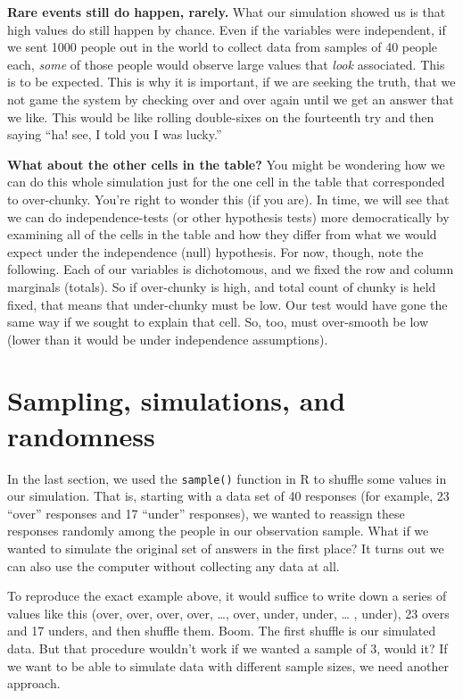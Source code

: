 \documentclass[openany]{book}
\begin{document}
\textbf{Rare events still do happen, rarely.} What our simulation showed us is that high values do still happen by chance. Even if the variables were independent, if we sent 1000 people out in the world to collect data from samples of 40 people each, \emph{some} of those people would observe large values that \emph{look} associated. This is to be expected. This is why it is important, if we are seeking the truth, that we not game the system by checking over and over again until we get an answer that we like. This would be like rolling double-sixes on the fourteenth try and then saying ``ha! see, I told you I was lucky.''

\textbf{What about the other cells in the table?} You might be wondering how we can do this whole simulation just for the one cell in the table that corresponded to over-chunky. You're right to wonder this (if you are). In time, we will see that we can do independence-tests (or other hypothesis tests) more democratically by examining all of the cells in the table and how they differ from what we would expect under the independence (null) hypothesis. For now, though, note the following. Each of our variables is dichotomous, and we fixed the row and column marginals (totals). So if over-chunky is high, and total count of chunky is held fixed, that means that under-chunky must be low. Our test would have gone the same way if we sought to explain that cell. So, too, must over-smooth be low (lower than it would be under independence assumptions).

\hypertarget{sampling-simulations-and-randomness}{%
\section*{Sampling, simulations, and randomness}\label{sampling-simulations-and-randomness}}

In the last section, we used the \texttt{sample()} function in R to shuffle some values in our simulation. That is, starting with a data set of 40 responses (for example, 23 ``over'' responses and 17 ``under'' responses), we wanted to reassign these responses randomly among the people in our observation sample. What if we wanted to simulate the original set of answers in the first place? It turns out we can also use the computer without collecting any data at all.

To reproduce the exact example above, it would suffice to write down a series of values like this (over, over, over, over, \ldots{}, over, under, under, \ldots{} , under), 23 overs and 17 unders, and then shuffle them. Boom. The first shuffle is our simulated data. But that procedure wouldn't work if we wanted a sample of 3, would it? If we want to be able to simulate data with different sample sizes, we need another approach.
\end{document}
